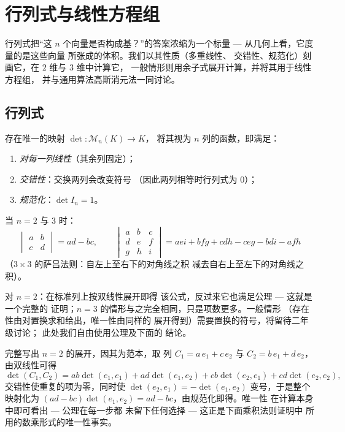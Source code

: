 \chapter{行列式与线性方程组}\label{ch:b1:det}

行列式把“这
$n$ 个向量是否构成基？”的答案浓缩为一个标量 --- 从几何上看，它度量的是这些向量
所张成的体积。我们以其性质（多重线性、
交错性、规范化）刻画它，在 $2$ 维与 $3$ 维中计算它，
一般情形则用余子式展开计算，并将其用于线性方程组，
并与通用算法高斯消元法一同讨论。

\section{行列式}

\begin{theorem}[刻画]\label{thm:b1:det:def}
存在唯一的映射 $\det \colon \mathcal{M}_n(K) \to K$，
将其视为 $n$ 列的函数，即满足：
\begin{enumerate}
  \item \emph{对每一列线性}（其余列固定）；
  \item \emph{交错性}：交换两列会改变符号
        （因此两列相等时行列式为 $0$）；
  \item \emph{规范化}：$\det I_n = 1$。
\end{enumerate}
当 $n = 2$ 与 $3$ 时：
\[
\begin{vmatrix} a & b\\ c & d\end{vmatrix} = ad - bc,
\qquad
\begin{vmatrix} a & b & c\\ d & e & f\\ g & h & i\end{vmatrix}
= aei + bfg + cdh - ceg - bdi - afh
\]
（$3 \times 3$ 的萨吕法则：自左上至右下的对角线之积
减去自右上至左下的对角线之积）。
\end{theorem}
\admitted

\begin{remark}
对 $n = 2$：在标准列上按双线性展开即得
该公式，反过来它也满足公理 --- 这就是一个完整的
证明；$n = 3$ 的情形与之完全相同，只是项数更多。一般情形
（存在性由对置换求和给出，唯一性由同样的
展开得到）需要置换的符号，将留待二年级讨论；
此处我们自由使用公理及下面的
结论。

完整写出 $n = 2$ 的展开，因其为范本，取
列 $C_1 = a\,e_1 + c\,e_2$ 与 $C_2 = b\,e_1 + d\,e_2$，
由双线性可得
\[
\det(C_1, C_2) = ab\det(e_1, e_1) + ad\det(e_1, e_2)
+ cb\det(e_2, e_1) + cd\det(e_2, e_2),
\]
交错性使重复的项为零，同时使
$\det(e_2, e_1) = -\det(e_1, e_2)$ 变号，于是整个映射化为
$(ad - bc)\det(e_1, e_2) = ad - bc$，由规范化即得。唯一性
在计算本身中即可看出 --- 公理在每一步都
未留下任何选择 --- 这正是下面乘积法则证明中
所用的数乘形式的唯一性事实。
\end{remark}

